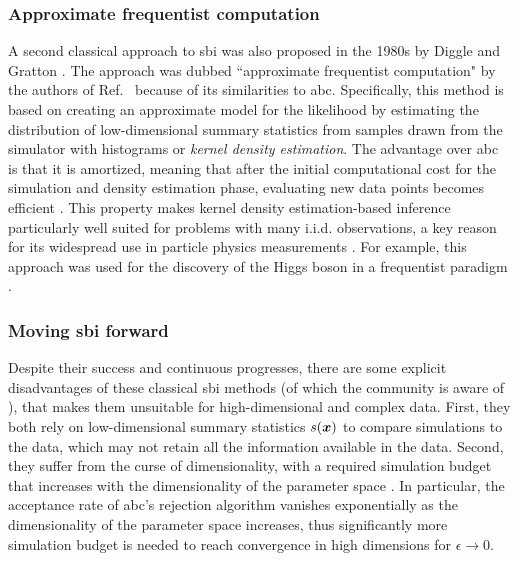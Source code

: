 \subsubsection{Approximate frequentist computation}

A second classical approach to \gls*{sbi} was also proposed in the 1980s by Diggle and Gratton \cite{diggle1984monte}. The approach was dubbed ``approximate frequentist computation" by the authors of Ref.~\cite{brehmer2018guide} because of its similarities to \gls*{abc}. Specifically, this method is based on creating an approximate model for the likelihood by estimating the distribution of low-dimensional summary statistics from samples drawn from the simulator with histograms or \emph{kernel density estimation}. The advantage over \gls*{abc} is that it is amortized, meaning that after the initial computational cost for the simulation and density estimation phase, evaluating new data points becomes efficient .
This property makes kernel density estimation-based inference particularly well suited for problems with many i.i.d. observations, a key reason for its widespread use in particle physics measurements \cite{Brehmer:2020cvb}. For example, this approach was used for the discovery of the Higgs boson in a frequentist paradigm \cite{brehmer2018guide}. 


\subsubsection{Moving \gls*{sbi} forward}

Despite their success and continuous progresses, there are some explicit disadvantages of these classical \gls*{sbi} methods (of which the community is aware of \cite[see \eg][]{Trotta:2017wnx}), that makes them unsuitable for high-dimensional and complex data. First, they both rely on low-dimensional summary statistics $s(\bm{x})$ to compare simulations to the data, which may not retain all the information available in the data. Second, they suffer from the curse of dimensionality, with a required simulation budget that increases with the dimensionality of the parameter space \cite[\eg][]{Leclercq:2018who}. In particular, the acceptance rate of \gls*{abc}'s rejection algorithm vanishes exponentially as the dimensionality of the parameter space increases, thus significantly more simulation budget is needed to reach convergence in high dimensions for $\epsilon \to 0$.

